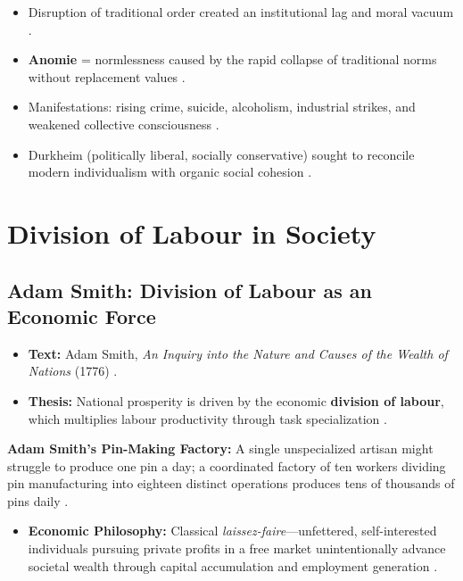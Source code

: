 \begin{QuickRevision}
\begin{itemize}
    \item Disruption of traditional order created an institutional lag and moral vacuum .
    \item \textbf{Anomie} = normlessness caused by the rapid collapse of traditional norms without replacement values .
    \item Manifestations: rising crime, suicide, alcoholism, industrial strikes, and weakened collective consciousness .
    \item Durkheim (politically liberal, socially conservative) sought to reconcile modern individualism with organic social cohesion .
\end{itemize}
\end{QuickRevision}

\sectiondivider

\section{Division of Labour in Society}

\subsection{Adam Smith: Division of Labour as an Economic Force}
\begin{itemize}
    \item \textbf{Text:} Adam Smith, \textit{An Inquiry into the Nature and Causes of the Wealth of Nations} (1776) .
    \item \textbf{Thesis:} National prosperity is driven by the economic \textbf{division of labour}, which multiplies labour productivity through task specialization .
\end{itemize}

\begin{ExampleBox}
\textbf{Adam Smith's Pin-Making Factory:} A single unspecialized artisan might struggle to produce one pin a day; a coordinated factory of ten workers dividing pin manufacturing into eighteen distinct operations produces tens of thousands of pins daily .
\end{ExampleBox}

\begin{itemize}
    \item \textbf{Economic Philosophy:} Classical \textit{laissez-faire}---unfettered, self-interested individuals pursuing private profits in a free market unintentionally advance societal wealth through capital accumulation and employment generation .
\end{itemize}


